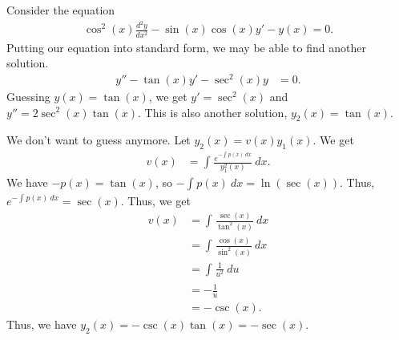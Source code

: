 \documentclass[10pt]{mypackage}
\begin{document}
\begin{example}
  Consider the equation
  \begin{align*}
    \cos^2\left(x\right)\frac{d^2y}{dx^2} - \sin(x)\cos(x)y' - y(x) = 0.
  \end{align*}
  Putting our equation into standard form, we may be able to find another solution.
  \begin{align*}
    y'' - \tan(x)y' - \sec^2\left(x\right)y &= 0.
  \end{align*}
  Guessing $y(x) = \tan(x)$, we get $y' = \sec^2\left(x\right)$ and $y'' = 2\sec^2\left(x\right)\tan(x)$. This is also another solution, $y_2(x) = \tan(x)$.\newline

  We don't want to guess anymore. Let $y_2(x) = v(x)y_1(x)$. We get
  \begin{align*}
    v(x) &= \int_{}^{} \frac{e^{-\int_{}^{} p(x)\:dx}}{y_1^2\left(x\right)}\:dx.
  \end{align*}
  We have $-p(x) = \tan(x)$, so $-\int_{}^{} p(x)\:dx = \ln\left(\sec(x)\right)$. Thus, $e^{-\int_{}^{} p(x)\:dx} = \sec(x)$. Thus, we get
  \begin{align*}
    v(x) &= \int_{}^{} \frac{\sec(x)}{\tan^2\left(x\right)}\:dx\\
         &= \int_{}^{} \frac{\cos(x)}{\sin^2\left(x\right)}\:dx\\
         &= \int_{}^{} \frac{1}{u^2}\:du\tag*{$u = \sin(x)$}\\
         &= -\frac{1}{u}\\
         &= -\csc(x).
  \end{align*}
  Thus, we have $y_2(x) = -\csc(x)\tan(x) = -\sec(x)$. 
\end{example}
\end{document}
